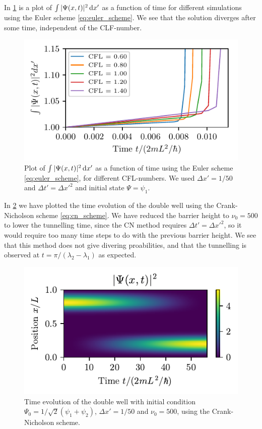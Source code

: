 In \cref{fig:euler_stability} is a plot of $\int |\Psi(x,t)|^2 \mathop{}\!\mathrm{d} x'$ as a function of time for different simulations using the Euler scheme \cref{eq:euler_scheme}. We see that the solution diverges after some time, independent of the CLF-number. 

\begin{figure}[ht!]%
\centering%
\includegraphics{figs/euler_stability.pdf}%
\caption{Plot of $\int |\Psi(x,t)|^2 \mathop{}\!\mathrm{d} x'$ as a function of time using the Euler scheme \cref{eq:euler_scheme}, for different CFL-numbers. We used $\Delta x' = 1/50$ and $\Delta t' = \Delta x'^2$ and initial state $\Psi = \psi_1$. \label{fig:euler_stability}}%
\end{figure}

In \cref{fig:cn_tunnel} we have plotted the time evolution of the double well using the Crank-Nicholson scheme \cref{eq:cn_scheme}. We have reduced the barrier height to $\nu_0 = 500$ to lower the tunnelling time, since the CN method requires $\Delta t' = \Delta x'^2$, so it would require too many time steps to do with the previous barrier height. We see that this method does not give divering proabilities, and that the tunnelling is observed at $t = \pi/(\lambda_2 - \lambda_1)$ as expected.

\begin{figure}[ht!]%
\centering%
\includegraphics{figs/double_cn_tunnel.pdf}%
\caption{Time evolution of the double well with initial condition $\Psi_0 = 1/\sqrt{2}(\psi_1 + \psi_2)$, $\Delta x' = 1/50$ and $\nu_0 = 500$, using the Crank-Nicholson scheme. \label{fig:cn_tunnel}}%
\end{figure}

